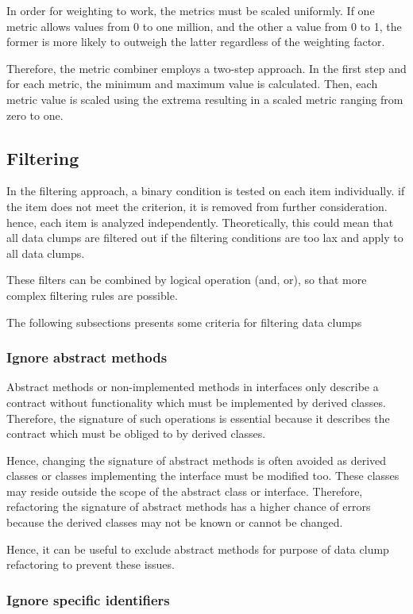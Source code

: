  In order for weighting to work, the metrics must be scaled uniformly. If one metric allows values from 0 to one million, and the other a value from 0 to 1, the former is more likely to outweigh the latter regardless of the weighting factor. 
 
 Therefore, the metric combiner employs a two-step approach. In the first step and for each metric, the minimum and maximum value is calculated. Then, each metric value is scaled using the extrema resulting in a scaled metric ranging from zero to one.  

\subsection{Filtering}
In the filtering approach, a binary condition is tested on each item individually. if the item does not meet the criterion, it is removed from further consideration. hence, each item is analyzed independently. Theoretically, this could mean that all data clumps are filtered out if the filtering conditions are too lax and apply to all data clumps. 

These filters can be combined by logical operation (and, or), so that more complex filtering rules are possible. 

The following subsections presents some  criteria for filtering data clumps
\subsubsection{Ignore abstract methods}

Abstract methods or non-implemented methods in interfaces only describe a contract without functionality which must be implemented by derived classes. Therefore, the signature of such operations is essential because it describes the contract which must be obliged to by derived classes.

Hence, changing the signature of abstract methods is often avoided as derived classes or classes implementing the interface must be modified too. These classes may reside outside the scope of the abstract class or interface. Therefore, refactoring the signature of abstract methods has a higher chance of errors because the derived classes may not be known or cannot be changed. 

Hence, it can be useful to exclude abstract methods for purpose of data clump refactoring to prevent these issues. 

\subsubsection{Ignore specific identifiers}

